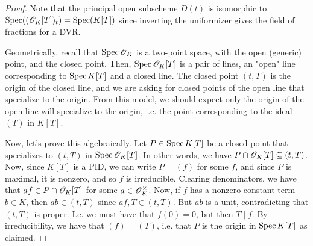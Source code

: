 \begin{proof}
	Note that the principal open subscheme $D(t)$ is isomorphic to $\operatorname{Spec}((\mathscr{O}_K[T])_t) = \operatorname{Spec}(K[T])$ since inverting the uniformizer gives the field of fractions for a DVR.
	
	Geometrically, recall that $\operatorname{Spec}\mathscr{O}_K$ is a two-point space, with the open (generic) point, and the closed point. Then, $\operatorname{Spec}\mathscr{O}_K[T]$ is a pair of lines, an "open" line corresponding to $\operatorname{Spec} K[T]$ and a closed line. The closed point $(t,T)$ is the origin of the closed line, and we are asking for closed points of the open line that specialize to the origin. From this model, we should expect only the origin of the open line will specialize to the origin, i.e. the point corresponding to the ideal $(T)$ in $K[T]$.
	
	Now, let's prove this algebraically. Let $P \in \operatorname{Spec} K[T]$ be a closed point that specializes to $(t,T)$ in $\operatorname{Spec}\mathscr{O}_K[T]$. In other words, we have $P \cap \mathscr{O}_K[T] \subseteq (t,T)$. Now, since $K[T]$ is a PID, we can write $P = (f)$ for some $f$, and since $P$ is maximal, it is nonzero, and so $f$ is irreducible. Clearing denominators, we have that $af \in P \cap \mathscr{O}_K[T]$ for some $a \in \mathscr{O}_K^\times$. Now, if $f$ has a nonzero constant term $b \in K$, then $ab \in (t,T)$ since $af,T \in (t,T)$. But $ab$ is a unit, contradicting that $(t,T)$ is proper. I.e. we must have that $f(0) = 0$, but then $T \mid f$. By irreducibility, we have that $(f) = (T)$, i.e. that $P$ is the origin in $\operatorname{Spec} K[T]$ as claimed.
\end{proof}

